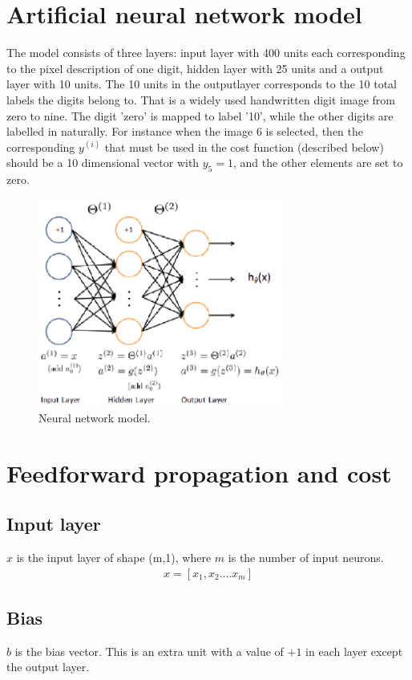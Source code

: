 \documentclass[twocolumn]{article}
\begin{document}
\section{Artificial neural network model}
The model consists of three layers: input layer with 400 units each corresponding to the pixel description of one digit, hidden layer with 25 units and a output layer with 10 units. The 10 units in the outputlayer corresponds to the 10 total labels the digits belong to. That is a widely used handwritten digit image from zero to nine. The digit 'zero' is mapped to label '10', while the other digits are labelled in naturally. For instance when the image 6 is selected, then the corresponding $y^{(i)}$ that must be used in the cost function (described below) should be a 10 dimensional vector with $y_5 = 1$, and the other elements are set to zero.
	   \begin{figure}[htbp]
                \centering
                \includegraphics[clip=true,trim=0cm 0cm 0cm 0cm,width=8cm]{../ann.ps}
                        \caption{Neural network model.}
                \label{fig:ann}
                \end{figure}
\section{Feedforward propagation and cost}

\subsection{Input layer}
$x$ is the input layer of shape (m,1), where $m$ is the number of input neurons.
\begin{align*}
	x = [x_1, x_2 ....x_m]
\end{align*}
\subsection{Bias}
$b$ is the bias vector. This is an extra unit with a value of $+1$ in each layer except the output layer.
\end{document}
